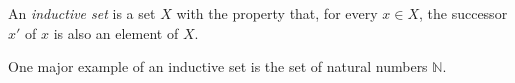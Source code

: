 \documentclass[12pt]{article}
\begin{document}
An {\em inductive set} is a set $X$ with the property that, for every $x \in X$, the successor $x'$ of $x$ is also an element of $X$.

One major example of an inductive set is the set of natural numbers $\mathbb{N}$.
\end{document}
